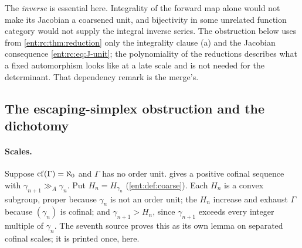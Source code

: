 \documentclass[11pt]{article}
\theoremstyle{plain}
\theoremstyle{plain}
\theoremstyle{plain}
\theoremstyle{definition}
\theoremstyle{definition}
\theoremstyle{definition}
\theoremstyle{definition}
\theoremstyle{remark}
\newcommand{\ggA}{\mathrel{\gg_{\!A}}}
\begin{document}
The \emph{inverse} is essential here. Integrality of the forward map alone
would not make its Jacobian a coarsened unit, and bijectivity in some
unrelated function category would not supply the integral inverse series.
The obstruction below uses from \cref{ent:rc:thm:reduction} only the
integrality clause (a) and the Jacobian consequence
\eqref{ent:rc:eq:J-unit}; the polynomiality of the reductions describes what a
fixed automorphism looks like at a late scale and is not needed for the
determinant. That dependency remark is the merge's.

\subsection{The escaping-simplex obstruction and the dichotomy}
\label{ent:rc:subsec:obstruction}

\paragraph{Scales.} Suppose $\operatorname{cf}(\Gamma)=\aleph_0$ and $\Gamma$ has no order
unit.  gives a positive cofinal sequence with
$\gamma_{n+1}\ggA\gamma_n$. Put $H_n=H_{\gamma_n}$ (\cref{ent:def:coarse}).
Each $H_n$ is a convex subgroup, proper because $\gamma_n$ is not an order
unit; the $H_n$ increase and exhaust $\Gamma$ because $(\gamma_n)$ is
cofinal; and $\gamma_{n+1}>H_n$, since $\gamma_{n+1}$ exceeds every integer
multiple of $\gamma_n$. The seventh source proves this as its own lemma on
separated cofinal scales; it is printed once, here.
\end{document}
